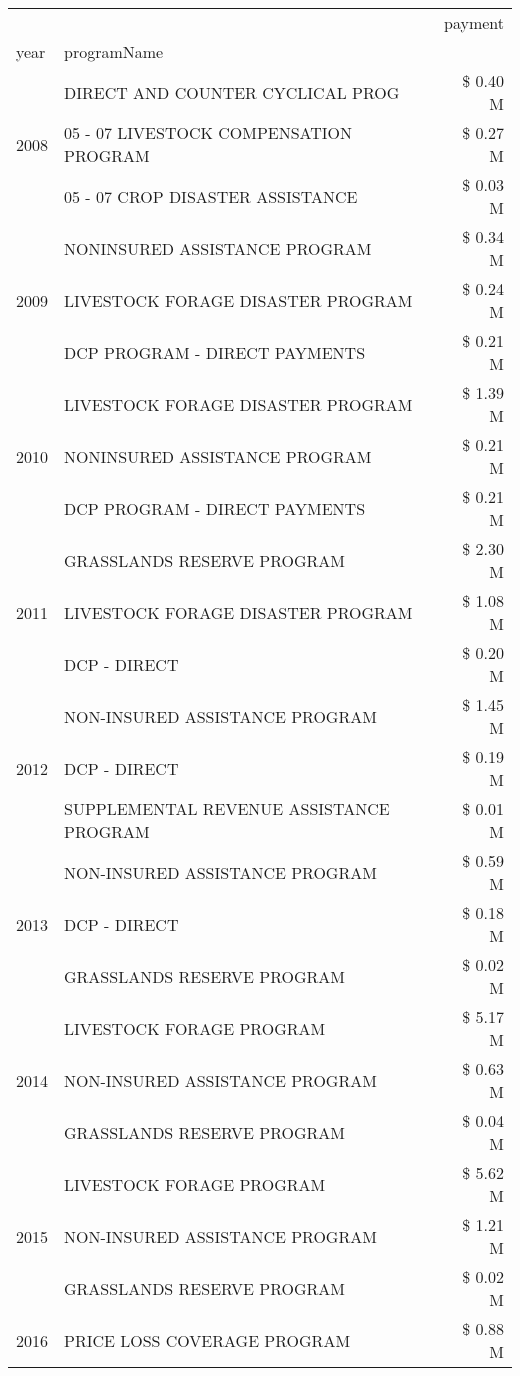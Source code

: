 \begin{tabular}{llr}
\toprule
 &  & payment \\
year & programName &  \\
\midrule
\multirow[t]{3}{*}{2008} & DIRECT AND COUNTER CYCLICAL PROG & \$ 0.40 M \\
 & 05 - 07 LIVESTOCK COMPENSATION PROGRAM & \$ 0.27 M \\
 & 05 - 07 CROP DISASTER ASSISTANCE & \$ 0.03 M \\
\cline{1-3}
\multirow[t]{3}{*}{2009} & NONINSURED ASSISTANCE PROGRAM & \$ 0.34 M \\
 & LIVESTOCK FORAGE DISASTER  PROGRAM & \$ 0.24 M \\
 & DCP PROGRAM - DIRECT PAYMENTS & \$ 0.21 M \\
\cline{1-3}
\multirow[t]{3}{*}{2010} & LIVESTOCK FORAGE DISASTER  PROGRAM & \$ 1.39 M \\
 & NONINSURED ASSISTANCE PROGRAM & \$ 0.21 M \\
 & DCP PROGRAM - DIRECT PAYMENTS & \$ 0.21 M \\
\cline{1-3}
\multirow[t]{3}{*}{2011} & GRASSLANDS RESERVE PROGRAM & \$ 2.30 M \\
 & LIVESTOCK FORAGE DISASTER PROGRAM & \$ 1.08 M \\
 & DCP - DIRECT & \$ 0.20 M \\
\cline{1-3}
\multirow[t]{3}{*}{2012} & NON-INSURED ASSISTANCE PROGRAM & \$ 1.45 M \\
 & DCP - DIRECT & \$ 0.19 M \\
 & SUPPLEMENTAL REVENUE ASSISTANCE PROGRAM & \$ 0.01 M \\
\cline{1-3}
\multirow[t]{3}{*}{2013} & NON-INSURED ASSISTANCE PROGRAM & \$ 0.59 M \\
 & DCP - DIRECT & \$ 0.18 M \\
 & GRASSLANDS RESERVE PROGRAM & \$ 0.02 M \\
\cline{1-3}
\multirow[t]{3}{*}{2014} & LIVESTOCK FORAGE PROGRAM & \$ 5.17 M \\
 & NON-INSURED ASSISTANCE PROGRAM & \$ 0.63 M \\
 & GRASSLANDS RESERVE PROGRAM & \$ 0.04 M \\
\cline{1-3}
\multirow[t]{3}{*}{2015} & LIVESTOCK FORAGE PROGRAM & \$ 5.62 M \\
 & NON-INSURED ASSISTANCE PROGRAM & \$ 1.21 M \\
 & GRASSLANDS RESERVE PROGRAM & \$ 0.02 M \\
\cline{1-3}
\multirow[t]{3}{*}{2016} & PRICE LOSS COVERAGE PROGRAM & \$ 0.88 M \\

\end{tabular}
